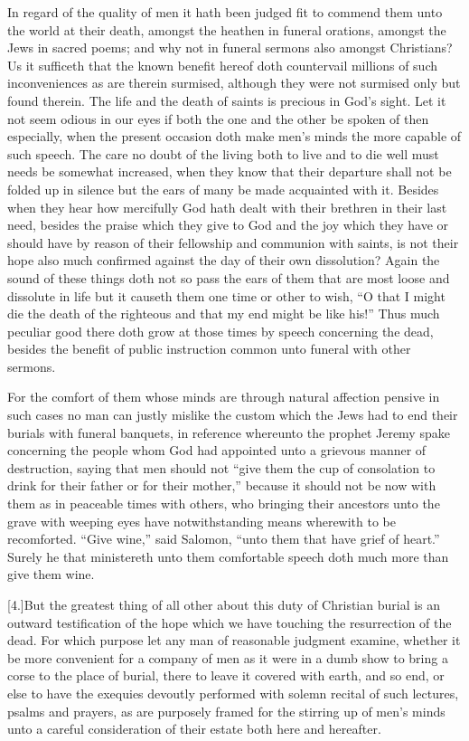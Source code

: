 In regard of the quality of men it hath been judged fit to commend them unto the world at their death, amongst the heathen in funeral orations, amongst the Jews in sacred poems; and why not in funeral sermons also amongst Christians? Us it sufficeth that the known benefit hereof doth countervail millions of such inconveniences as are therein surmised, although they were not surmised only but found therein. The life and the death of saints is precious in God’s sight. Let it not seem odious in our eyes if both the one and the other be spoken of then especially, when the present occasion doth make men’s minds the more capable of such speech. The care no doubt of the living both to live and to die well must needs be somewhat increased, when they know  that their departure shall not be folded up in silence but the ears of many be made acquainted with it.
 Besides when they hear how mercifully God hath dealt with their brethren in their last need, besides the praise which they give to God and the joy which they have or should have by reason of their fellowship and communion with saints, is not their hope also much confirmed against the day of their own dissolution? Again the sound of these things doth not so pass the ears of them that are most loose and dissolute in life but it causeth them one time or other to wish, “O that I might die the death of the righteous and that my end might be like his!” Thus much peculiar good there doth grow at those times by speech concerning the dead, besides the benefit of public instruction common unto funeral with other sermons.

For the comfort of them whose minds are through natural affection pensive in such cases no man can justly mislike the custom which the Jews had to end their burials with funeral banquets, in reference whereunto the prophet Jeremy spake concerning the people whom God had appointed unto a grievous manner of destruction, saying that men should not “give them the cup of consolation to drink for their father or for their mother,” because it should not be now with them as in peaceable times with others, who bringing their ancestors unto the grave with weeping eyes have notwithstanding means wherewith to be recomforted. “Give wine,” said Salomon, “unto them that have grief of heart.” Surely he that ministereth unto them comfortable speech doth much more than give them wine.

[4.]But the greatest thing of all other about this duty of Christian burial is an outward testification of the hope which we have touching the resurrection of the dead. For which purpose let any man of reasonable judgment examine, whether  it be more convenient for a company of men as it were in a dumb show to bring a corse to the place of burial, there to leave it covered with earth, and so end, or else to have the exequies devoutly performed with solemn recital of such lectures, psalms and prayers, as are purposely framed for the stirring up of men’s minds unto a careful consideration of their estate both here and hereafter.

